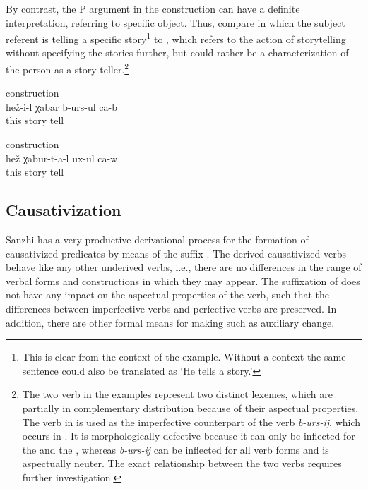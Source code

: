 By contrast, the P argument in the  construction can have a definite interpretation, referring to specific object. Thus, compare  in which the subject referent is telling a specific story\footnote{This is clear from the context of the example. Without a context the same sentence could also be translated as `He tells a story.'} to , which refers to the action of storytelling without specifying the stories further, but could rather be a characterization of the person as a story-teller.\footnote{The two verb in the examples represent two distinct lexemes, which are partially in complementary distribution because of their aspectual properties. The verb in  is used as the imperfective counterpart of the verb \textit{b-urs-ij}, which occurs in . It is morphologically defective because it can only be inflected for the  and the , whereas \textit{b-urs-ij} can be inflected for all verb forms and is aspectually neuter. The exact relationship between the two verbs requires further investigation.} 
%
\begin{exe}
	\ex	{} construction \label{ex:He tells the story} \\
	\gll	hež-i-l	χabar	b-urs-ul	ca-b\\
		this	story	tell	\\
	\glt	{}

	\ex	{} construction \label{ex:He tells many stories} \\
	\gll	hež	χabur-t-a-l	ux-ul	ca-w\\
		this	story	tell	\\
	\glt	{}
\end{exe}



\subsection{Causativization}
\label{sec:Causativization}

Sanzhi has a very productive derivational process for the formation of causativized predicates by means of the suffix . The derived causativized verbs behave like any other underived verbs, i.e., there are no differences in the range of verbal forms and constructions in which they may appear. The suffixation of  does not have any impact on the aspectual properties of the verb, such that the differences between imperfective verbs and perfective verbs are preserved. In addition, there are other formal means for making  such as auxiliary change.

